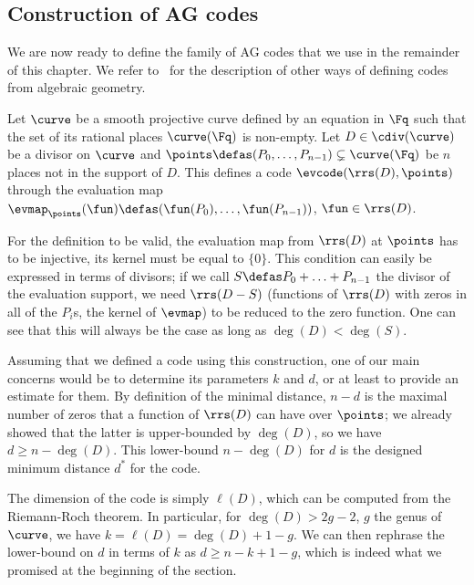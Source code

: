 \subsection{Construction of AG codes}
\label{sec:constr_ag}

We are now ready to define the family of AG codes that we use in the remainder of this chapter. We refer
to~\cite[Chapter 4]{tvn} for the description of other ways of defining codes from algebraic geometry.

Let $\curve$ be a smooth projective curve defined by an equation in $\Fq$ such that the set of its rational places $\curve(\Fq)$ is non-empty.
Let $D \in \cdiv(\curve)$ be a divisor on $\curve$ and $\points \defas (P_0, \ldots, P_{n-1}) \subsetneq \curve(\Fq)$ be $n$ places not in the support of $D$.
This defines a code $\evcode(\rrs(D), \points)$ through the evaluation map $\evmap_\points(\fun) \defas (\fun(P_0),\ldots,\fun(P_{n-1}))$, $\fun \in \rrs(D)$.

For the definition to be valid, the evaluation map from $\rrs(D)$ at $\points$ has to be injective, \ie its kernel must be equal to $\{0\}$.
This condition can easily be expressed in terms of divisors; if we call $S \defas P_0 + \ldots + P_{n-1}$ the divisor of the
evaluation support, we need $\rrs(D - S)$ (\ie functions of $\rrs(D)$ with zeros in all of the $P_i$s, \ie the kernel of $\evmap$) to be reduced to the zero function.
One can see that this will always be the case as long as $\deg(D) < \deg(S)$.

\medskip

Assuming that we defined a code using this construction, one of our main concerns would be to determine its parameters $k$ and $d$, or at least to provide an estimate
for them.
By definition of the minimal distance, $n - d$ is the maximal number of zeros that a function of $\rrs(D)$ can have
over $\points$; we already showed that the latter is upper-bounded by $\deg(D)$, so we have $d \geq n - \deg(D)$. This lower-bound
$n - \deg(D)$ for $d$ is the designed minimum distance $d^*$ for the code.

The dimension of the code is simply $\ell(D)$, which can be computed from the Riemann-Roch theorem. In particular, for $\deg(D) > 2g -2$, $g$ the genus of
$\curve$, we have $k = \ell(D) = \deg(D) + 1 - g$. We can then rephrase the lower-bound on $d$ in terms of $k$ as $d \geq n - k + 1 - g$, which is indeed
what we promised at the beginning of the section.

\medskip

